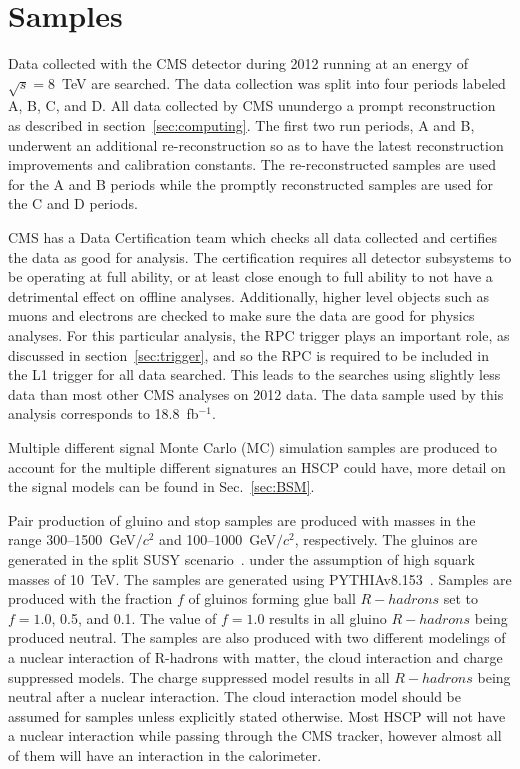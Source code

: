 \section{Samples \label{sec:samples}}

Data collected with the CMS detector during 2012 running at an energy of $\sqrt{s}=8$~TeV are searched. The data collection was split into four periods labeled A, B, C, and D.
All data collected by CMS unundergo a prompt reconstruction as described in section~\ref{sec:computing}. The first two run periods, A and B, underwent an additional
re-reconstruction so as to have the latest reconstruction improvements and calibration constants. The re-reconstructed samples are used for the A and B periods while the promptly
reconstructed samples are used for the C and D periods.

CMS has a Data Certification team which checks all data collected and certifies the data as good for analysis. The certification requires all detector subsystems to be
operating at full ability, or at least close enough to full ability to not have a detrimental effect on offline analyses. Additionally, higher level objects such as muons
and electrons are checked to make sure the data are good for physics analyses. For this particular analysis, the RPC trigger plays an important role, as discussed in
section~\ref{sec:trigger}, and so the RPC is required to be included in the L1 trigger for all data searched. This leads to the searches using slightly less data
than most other CMS analyses on 2012 data. The data sample used by this analysis corresponds to 18.8~fb$^{-1}$.

Multiple different signal Monte Carlo (MC) simulation samples are produced to account for the multiple different signatures an HSCP could have,
more detail on the signal models can be found in Sec.~\ref{sec:BSM}.

Pair production of gluino and stop samples are produced with
masses in the range 300--1500~GeV$/c^2$ and 100--1000~GeV$/c^2$, respectively.
The gluinos are generated in the split SUSY scenario~\cite{ArkaniHamed:2004fb, Giudice:2004tc}. 
under the assumption of high squark masses of 10~TeV. The samples are generated using PYTHIAv8.153~\cite{Sjostrand:2007gs}. 
Samples are produced with the fraction $f$ of gluinos forming glue ball $R-hadrons$ set to $f=1.0$, 0.5, and 0.1.
The value of $f=1.0$ results in all gluino $R-hadrons$ being produced neutral.
The samples are also produced with two different modelings of a nuclear interaction of R-hadrons with matter, the cloud interaction and charge suppressed models.
The charge suppressed model results in all $R-hadrons$ being neutral after a nuclear interaction.
The cloud interaction model should be assumed for samples unless explicitly stated otherwise.
Most HSCP will not have a nuclear interaction while passing through the CMS tracker, however almost all of them will have an interaction in the calorimeter.

